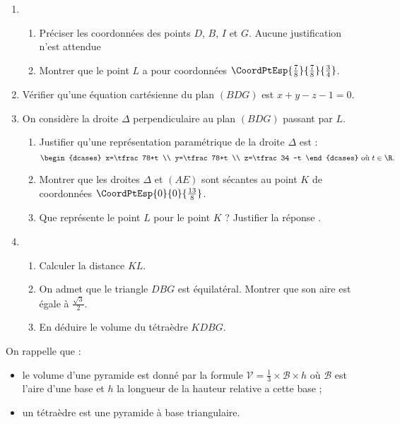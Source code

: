 \begin{enumerate}
	\item 
	\begin{enumerate}
		\item Préciser les coordonnées des points $D$, $B$, $I$ et $G$. Aucune justification n'est attendue 
		\item Montrer que le point $L$ a pour coordonnées $\CoordPtEsp{\frac78}{\frac78}{\frac34}$.
	\end{enumerate}
	\item Vérifier qu'une équation cartésienne du plan $(BDG)$ est $x+y-z-1=0$.
	\item On considère la droite $\Delta$ perpendiculaire au plan $(BDG)$ passant par $L$.
	\begin{enumerate}
		\item Justifier qu'une représentation paramétrique de la droite $\Delta$ est : \[ \begin{dcases} x=\tfrac78+t \\ y=\tfrac78+t \\ z=\tfrac34 -t \end{dcases} \text{ où } t \in \R. \]
		\item Montrer que les droites $\Delta$ et $(AE)$ sont sécantes au point $K$ de coordonnées $\CoordPtEsp{0}{0}{\frac{13}{8}}$.
		\item Que représente le point $L$ pour le point $K$ ? Justifier la réponse . 
	\end{enumerate}
	\item 
	\begin{enumerate}
		\item Calculer la distance $KL$.
		\item On admet que le triangle $DBG$ est équilatéral. Montrer que son aire est égale à $\frac{\sqrt{3}}{2}$.
		\item En déduire le volume du tétraèdre $KDBG$.
	\end{enumerate}
\end{enumerate}

On rappelle que :

\begin{itemize}
	\item le volume d'une pyramide est donné par la formule $\mathcal{V} = \frac13 \times \mathcal{B} \times h$ où $\mathcal{B}$  est l'aire d'une base et $h$ la longueur de la
	hauteur relative a cette base ;
	\item un tétraèdre est une pyramide à base triangulaire.
\end{itemize}

